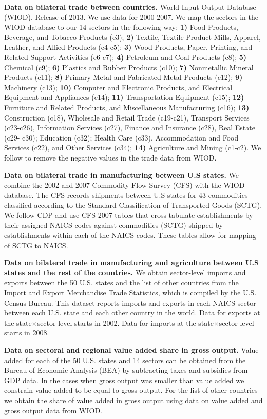 \documentclass[12pt]{article}
\begin{document}
\textbf{Data on bilateral trade between countries.} World Input-Output Database (WIOD). Release of 2013. We use data for 2000-2007. We map the sectors in the WIOD database to our 14 sectors in the following way: \textbf{1)} Food Products, Beverage, and Tobacco Products (c3); \textbf{2)} Textile, Textile Product Mills, Apparel, Leather, and Allied Products (c4-c5); \textbf{3)} Wood Products, Paper, Printing, and Related Support Activities (c6-c7); \textbf{4)} Petroleum and Coal Products (c8); \textbf{5)} Chemical (c9); \textbf{6)} Plastics and Rubber Products (c10); \textbf{7)} Nonmetallic Mineral Products (c11); \textbf{8)} Primary Metal and Fabricated Metal Products (c12); \textbf{9)} Machinery (c13); \textbf{10)} Computer and Electronic Products, and Electrical Equipment and Appliances (c14); \textbf{11)} Transportation Equipment (c15); \textbf{12)} Furniture and Related Products, and Miscellaneous Manufacturing (c16); \textbf{13)} Construction (c18), Wholesale and Retail Trade (c19-c21), Transport Services (c23-c26), Information Services (c27), Finance and Insurance (c28), Real Estate (c29-
c30); Education (c32); Health Care (c33), Accommodation and Food Services (c22), and Other Services (c34); \textbf{14)} Agriculture and Mining (c1-c2). We follow \cite{Costinot2014} to remove the negative values in the trade data from WIOD.

\textbf{Data on bilateral trade in manufacturing between U.S states.} We combine the 2002 and 2007 Commodity Flow Survey (CFS) with the WIOD database. The CFS records shipments between U.S states for 43 commodities classified according to the Standard Classification of Transported Goods (SCTG). We follow CDP and use CFS 2007 tables that cross-tabulate establishments by their assigned NAICS codes against commodities (SCTG) shipped by establishments within each of the NAICS codes. These tables allow for mapping of SCTG to NAICS.

\textbf{Data on bilateral trade in manufacturing and agriculture between U.S states and the rest of the countries.} We obtain sector-level imports and exports  between the 50 U.S. states and the list of other countries from the Import and Export Merchandise Trade Statistics, which is compiled by the U.S. Census Bureau. This dataset  reports imports and exports in each NAICS sector between each U.S. state and each other country in the world. Data for exports at the  state$\times$sector level starts in 2002. Data for imports at the state$\times$sector level starts in 2008.

\textbf{Data on sectoral and regional value added share in gross output.} Value added for each of the 50 U.S. states and 14 sectors can be obtained from the Bureau of Economic Analysis (BEA) by subtracting taxes and subsidies from GDP data. In the cases when gross output was smaller than value added we constrain value added to be equal to gross output. For the list of other countries we obtain the share of value added in gross output using data on value added and gross output data from WIOD.
\end{document}
